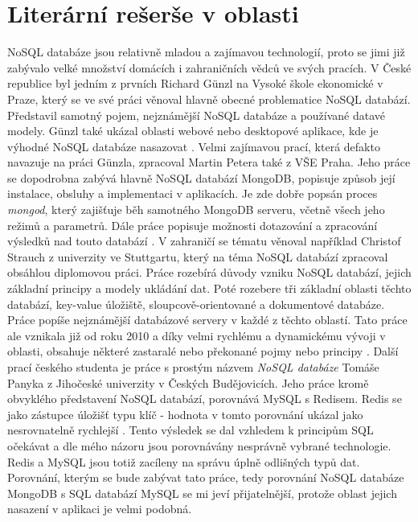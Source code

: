 \section{Literární rešerše v oblasti}
NoSQL databáze jsou relativně mladou a zajímavou technologií, proto se jimi již zabývalo velké množství domácích i zahraničních vědců ve svých pracích. V České republice byl jedním z prvních Richard Günzl na Vysoké škole ekonomické v Praze, který se ve své práci věnoval hlavně obecné problematice NoSQL databází. Představil samotný pojem, nejznámější NoSQL databáze a používané datavé modely. Günzl také ukázal oblasti webové nebo desktopové aplikace, kde je výhodné NoSQL databáze nasazovat \cite{gunzl}. Velmi zajímavou prací, která defakto navazuje na práci Günzla, zpracoval Martin Petera také z VŠE Praha. Jeho práce se dopodrobna zabývá hlavně NoSQL databází MongoDB, popisuje způsob její instalace, obsluhy a implementaci v aplikacích. Je zde dobře popsán proces \emph{mongod}, který zajišťuje běh samotného MongoDB serveru, včetně všech jeho režimů a parametrů. Dále práce popisuje možnosti dotazování a zpracování výsledků nad touto databází \cite{peteraMongo}. V zahraničí se tématu věnoval například Christof Strauch z univerzity ve Stuttgartu, který na téma NoSQL databází zpracoval obsáhlou diplomovou práci. Práce rozebírá důvody vzniku NoSQL databází, jejich základní principy a modely ukládání dat. Poté rozebere tři základní oblasti těchto databází, key-value úložiště, sloupcově-orientované a dokumentové databáze. Práce popíše nejznámější databázové servery v každé z těchto oblastí. Tato práce ale vznikala již od roku 2010 a díky velmi rychlému a dynamickému vývoji v oblasti, obsahuje některé zastaralé nebo překonané pojmy nebo principy \cite{strauchNosql}. Další prací českého studenta je práce s prostým názvem \emph{NoSQL databáze} Tomáše Panyka z Jihočeské univerzity v Českých Budějovicích. Jeho práce kromě obvyklého představení NoSQL databází, porovnává MySQL s Redisem. Redis se jako zástupce úložišť typu klíč - hodnota v tomto porovnání ukázal jako nesrovnatelně rychlejší \cite{panykoNosql}. Tento výsledek se dal vzhledem k principům SQL očekávat a dle mého názoru jsou porovnávány nesprávně vybrané technologie. Redis a MySQL jsou totiž zacíleny na správu úplně odlišných typů dat. Porovnání, kterým se bude zabývat tato práce, tedy porovnání NoSQL databáze MongoDB s SQL databází MySQL se mi jeví přijatelnější, protože oblast jejich nasazení v aplikaci je velmi podobná.
